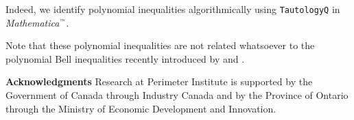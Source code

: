 
Indeed, we identify polynomial inequalities algorithmically using \texttt{TautologyQ} in {\it Mathematica$^\text{\it\tiny\texttrademark}$}.


Note that these polynomial inequalities are not related whatsoever to the polynomial Bell inequalities recently introduced by \citet{ChavesPolynomial} and \citet{RossetNetworks}.

\begin{comment}


\begin{comment}

Tobias has proved that the following inequalities hold for all classical correlations in the triangle scenario:
\begin{align}
p&\parens{a} \p{c}  \leq  \p{ab} + \p{\nbf c}\\
\begin{split}
p&\parens{a b\ncf} \p{a \nbf c} \p{\naf b c} \leq \p{abc}\\
& + \p{\naf \nbf} \p{a b \ncf} \p{a}\\& + \p{\naf\ncf} \p{a\nbf c} \p{c}\\&  + \p{\nbf \ncf} \p{\naf b c} \p{b}
\end{split}
\end{align}
and more. \purp{Proof currently in other LaTeX file, merging slowly.}
\end{comment}



\begin{acknowledgments}
\bigskip\noindent\textbf{Acknowledgments}
Research at Perimeter Institute is supported by the Government of Canada through Industry Canada and by the Province of Ontario through the Ministry of Economic Development and Innovation.
\end{acknowledgments}

\nocite{*}
\setlength{\bibsep}{3pt plus 3pt minus 2pt}





